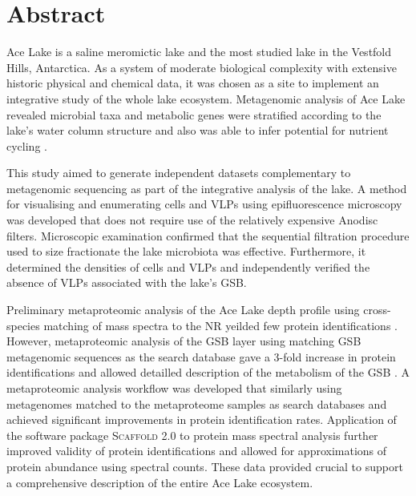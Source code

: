 \section{Abstract}
Ace Lake is a saline meromictic lake and the most studied lake in the Vestfold Hills, Antarctica.
As a system of moderate biological complexity with extensive historic physical and chemical data, it was chosen as a site to implement an integrative study of the whole lake ecosystem.
Metagenomic analysis of Ace Lake revealed microbial taxa and metabolic genes were stratified according to the lake's water column structure and also was able to infer potential for nutrient cycling \cite{Lauro2011}.

This study aimed to generate independent datasets complementary to metagenomic sequencing as part of the integrative analysis of the lake.
A method for visualising and enumerating cells and \acp{VLP} using epifluorescence microscopy was developed that does not require use of the relatively expensive Anodisc filters.
Microscopic examination confirmed that the sequential filtration procedure used to size fractionate the lake microbiota was effective. 
Furthermore, it determined the densities of cells and \acp{VLP} and independently verified the absence of \acp{VLP} associated with the lake's \ac{GSB}.

Preliminary metaproteomic analysis of the Ace Lake depth profile using cross-species matching of mass spectra to the \ac{NR} yeilded few protein identifications \cite{Ng2010b}.
However, metaproteomic analysis of the \ac{GSB} layer using matching \ac{GSB} metagenomic sequences as the search database gave a 3-fold increase in protein identifications and allowed detailled description of the metabolism of the \ac{GSB} \cite{Ng2010a,Ng2010b}.
A metaproteomic analysis workflow was developed that similarly using metagenomes matched to the metaproteome samples as search databases and achieved significant improvements in protein identification rates.
Application of the software package \textsc{Scaffold} 2.0 to protein mass spectral analysis further improved validity of protein identifications and allowed for approximations of protein abundance using spectral counts.
These data provided crucial to support a comprehensive description of the  entire Ace Lake ecosystem. 

